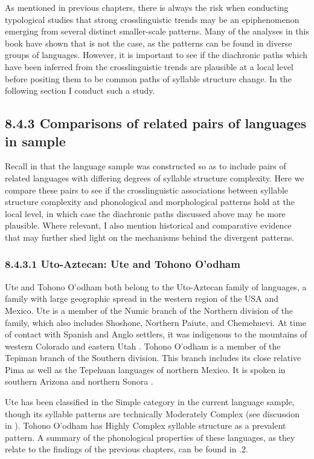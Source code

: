   As mentioned in previous chapters, there is always the risk when conducting typological studies that strong crosslinguistic trends may be an epiphenomenon emerging from several distinct smaller-scale patterns. Many of the analyses in this book have shown that is not the case, as the patterns can be found in diverse groups of languages. However, it is important to see if the diachronic paths which have been inferred from the crosslinguistic trends are plausible at a local level before positing them to be common paths of syllable structure change. In the following section I conduct such a study.

\subsection{8.4.3 Comparisons of related pairs of languages in sample}

  Recall in  that the language sample was constructed so as to include pairs of related languages with differing degrees of syllable structure complexity. Here we compare these pairs to see if the crosslinguistic associations between syllable structure complexity and phonological and morphological patterns hold at the local level, in which case the diachronic paths discussed above may be more plausible. Where relevant, I also mention historical and comparative evidence that may further shed light on the mechanisms behind the divergent patterns.

\subsubsection{\textbf{8.4.3.1} \textbf{Uto-Aztecan:} \textbf{Ute} \textbf{and} \textbf{Tohono} \textbf{O’odham}}

  Ute and Tohono O’odham both belong to the Uto-Aztecan family of languages, a family with large geographic spread in the western region of the USA and Mexico. Ute is a member of the Numic branch of the Northern division of the family, which also includes Shoshone, Northern Paiute, and Chemehuevi. At time of contact with Spanish and Anglo settlers, it was indigenous to the mountains of western Colorado and eastern Utah \citep{Givón2011}. Tohono O’odham is a member of the Tepiman branch of the Southern division. This branch includes its close relative Pima as well as the Tepehuan languages of northern Mexico. It is spoken in southern Arizona and northern Sonora \citep{Zepeda1983}.

  Ute has been classified in the Simple category in the current language sample, though its syllable patterns are technically Moderately Complex (see discussion in ). Tohono O’odham has Highly Complex syllable structure as a prevalent pattern. A summary of the phonological properties of these languages, as they relate to the findings of the previous chapters, can be found in .2.

